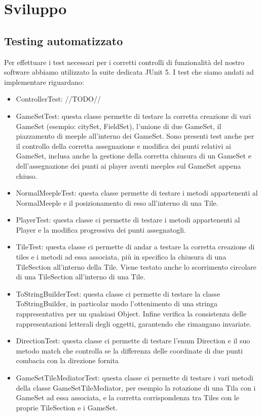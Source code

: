 \section{Sviluppo}
\subsection{Testing automatizzato}
Per effettuare i test necessari per i corretti controlli di funzionalità del nostro software abbiamo utilizzato la suite dedicata JUnit 5. I test che siamo andati ad implementare riguardano:
\begin{itemize}
    \item ControllerTest: //TODO//
    \item GameSetTest: questa classe permette di testare la corretta creazione di vari GameSet (esempio: citySet, FieldSet), l'unione di due GameSet, il piazzamento di meeple all'interno dei GameSet. Sono presenti test anche per il controllo della corretta assegnazione e modifica dei punti relativi ai GameSet, inclusa anche la gestione della corretta chiusura di un GameSet e dell'assegnazione dei punti ai player aventi meeples sul GameSet appena chiuso. 
    \item NormalMeepleTest: questa classe permette di testare i metodi appartenenti al NormalMeeple e il posizionamento di esso all'interno di una Tile.
    \item PlayerTest: questa classe ci permette di testare i metodi appartenenti al Player e la modifica progressiva dei punti assegnatogli.
    \item TileTest: questa classe ci permette di andar a testare la corretta creazione di tiles e i metodi ad essa associata, più in specifico la chiusura di una TileSection all'interno della Tile. Viene testato anche lo scorrimento circolare di una TileSection all'interno di una Tile.
    \item ToStringBuilderTest: questa classe ci permette di testare la classe ToStringBuilder, in particolar modo l'ottenimento di una stringa rappresentativa per un qualsiasi Object. Infine verifica la consistenza delle rappresentazioni letterali degli oggetti, garantendo che rimangano invariate.
    \item DirectionTest: questa classe ci permette di testare l'enum Direction e il suo metodo match che controlla se la differenza delle coordinate di due punti combacia con la direzione fornita
    \item GameSetTileMediatorTest: questa classe ci permette di testare i vari metodi della classe GameSetTileMediator, per esempio la rotazione di una Tila con i GameSet ad essa associata, e la corretta corrispondenza tra Tiles con le proprie TileSection e i GameSet.
\end{itemize}

